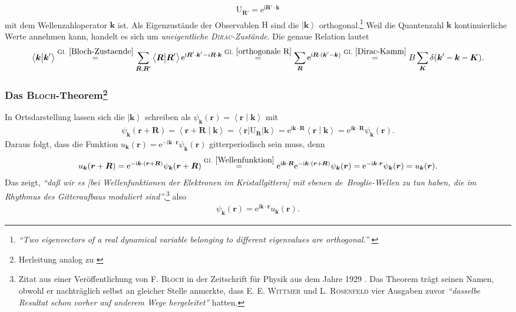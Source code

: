 \documentclass[a4paper, 10pt, twoside, openany]{book} %
\newcommand \bra[1]{\left \langle #1 \right |}
\newcommand \ket[1]{\left | #1 \right \rangle}
\newcommand \bracket[2]{\left \langle #1 \middle | #2 \right \rangle}
\def \I {\mathrm i}
\def \E {\mathrm e}
\def \vec {\boldsymbol}
\newcommand \op[1]{\mathrm{#1}}
\begin{document}
%
\begin{align*}
    \op U_{\vec R'} = \E^{\I \vec R' \cdot \mathbf k}
\end{align*}
%
mit dem Wellenzahloperator $\mathbf k$ ist. Als Eigenzustände der Observablen $\op H$ sind die $\ket{\vec k}$ orthogonal.\footnote{\emph{"`Two eigenvectors of a real dynamical variable belonging to different eigenvalues are orthogonal."'} \cite[S.~32]{Dirac}} Weil die Quantenzahl $\vec k$ kontinuierliche Werte annehmen kann, handelt es sich um \emph{uneigentliche \textsc{Dirac}-Zustände}. Die genaue Relation lautet
%
\begin{align}
    \bracket{\vec k}{\vec k'} \overset{\rm Gl.~\ref{Bloch-Zustaende}} = \sum_{\vec R, \vec R'} \bracket{\vec R}{\vec R'} \E^{\I \vec R' \cdot \vec k' - i \vec R \cdot \vec k} \overset{\rm Gl.~\ref{orthogonale R}} = \sum_{\vec R} \E^{\I \vec R \cdot (\vec k' - \vec k)} \overset{\rm Gl.~\ref{Dirac-Kamm}} = B \sum_{\vec K} \delta(\vec k' - \vec k - \vec K).
    \label{orthogonale k}
\end{align}

\subsubsection*{Das \textsc{Bloch}-Theorem\footnote{Herleitung analog zu \cite[S.~97]{Czycholl}}}

In Ortsdarstellung lassen sich die $\ket{\vec k}$ schreiben als $\psi_{\vec k}(\vec r) = \bracket{\vec r}{\vec k}$ mit
%
\begin{align}
     \psi_{\vec k}(\vec r + \vec R) = \bracket{\vec r + \vec R}{\vec k} = \bra{\vec r} \op U_{\vec R} \ket{\vec k} = \E^{\I \vec k \cdot \vec R} \bracket{\vec r}{\vec k} = \E^{\I \vec k \cdot \vec R} \psi_{\vec k}(\vec r).
     \label{Wellenfunktion}
\end{align}
%
Daraus folgt, dass die Funktion $u_{\vec k}(\vec r) = \E^{-\I \vec k \cdot \vec r} \psi_{\vec k}(\vec r)$ gitterperiodisch sein muss, denn
%
\begin{align*}
    u_{\vec k}(\vec r + \vec R) = \E^{-\I \vec k \cdot (\vec r + \vec R)} \psi_{\vec k}(\vec r + \vec R) \overset{\rm Gl.~\ref{Wellenfunktion}} = \E^{\I \vec k \cdot \vec R} \E^{-\I \vec k \cdot (\vec r + \vec R)} \psi_{\vec k}(\vec r) = \E^{-\I \vec k \cdot \vec r} \psi_{\vec k}(\vec r) = u_{\vec k}(\vec r).
\end{align*}
%
Das zeigt, \emph{"`daß wir es \textnormal{[bei Wellenfunktionen der Elektronen im Kristallgittern]} mit ebenen de~Broglie-Wellen zu tun haben, die im Rhythmus des Gitteraufbaus moduliert sind"'},\footnote{Zitat aus einer Veröffentlichung von \textsc{F. Bloch} in der Zeitschrift für Physik aus dem Jahre 1929 \cite[S.~559]{Bloch}. Das Theorem trägt seinen Namen, obwohl er nachträglich selbst an gleicher Stelle anmerkte, dass \textsc{E. E. Wittmer} und \textsc{L. Rosenfeld} vier Ausgaben zuvor \emph{"`dasselbe Resultat schon vorher auf anderem Wege hergeleitet"'} hatten.} also
%
\begin{align*}
    \psi_{\vec k}(\vec r) = \E^{\I \vec k \cdot \vec r} u_{\vec k}(\vec r).
\end{align*}
\end{document}
